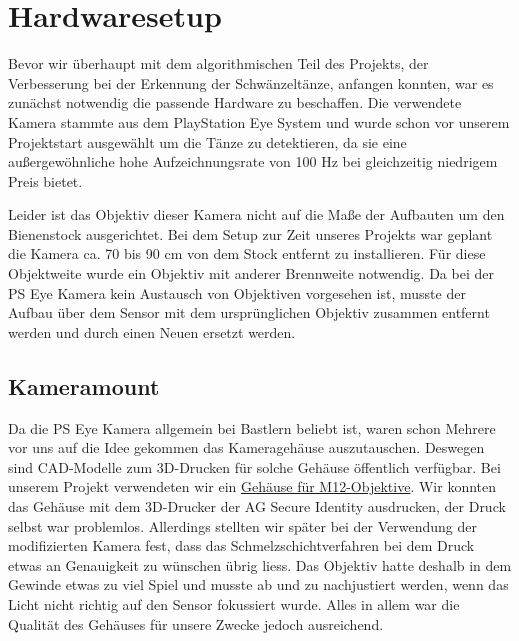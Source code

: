 \documentclass[11pt,a4paper]{article}
\title{\Veranstaltung}
\author{\Autoren}
\date{\today}
\begin{document}
\maketitle


%
%
%
%

\section{Hardwaresetup}%

Bevor wir überhaupt mit dem algorithmischen Teil des Projekts, der Verbesserung bei der Erkennung der Schwänzeltänze,
anfangen konnten, war es zunächst notwendig die passende Hardware zu beschaffen.
Die verwendete Kamera stammte aus dem PlayStation Eye System und wurde schon vor unserem Projektstart ausgewählt um 
die Tänze zu detektieren, da sie eine außergewöhnliche hohe Aufzeichnungsrate von 100 Hz bei gleichzeitig niedrigem Preis bietet.

Leider ist das Objektiv dieser Kamera nicht auf die Maße der Aufbauten um den Bienenstock ausgerichtet.
Bei dem Setup zur Zeit unseres Projekts war geplant die Kamera ca. 70 bis 90 cm von dem Stock entfernt zu installieren.
Für diese Objektweite wurde ein Objektiv mit anderer Brennweite notwendig.
Da bei der PS Eye Kamera kein Austausch von Objektiven vorgesehen ist, musste der Aufbau über dem Sensor mit dem ursprünglichen
Objektiv zusammen entfernt werden und durch einen Neuen ersetzt werden.

\subsection{Kameramount}%

Da die PS Eye Kamera allgemein bei Bastlern beliebt ist, waren schon Mehrere vor uns auf die Idee gekommen das Kameragehäuse auszutauschen.
Deswegen sind CAD-Modelle zum 3D-Drucken für solche Gehäuse öffentlich verfügbar.
Bei unserem Projekt verwendeten wir ein \href{http://www.thingiverse.com/thing:83754}{Gehäuse für M12-Objektive}.
Wir konnten das Gehäuse mit dem 3D-Drucker der AG Secure Identity ausdrucken, der Druck selbst war problemlos.
Allerdings stellten wir später bei der Verwendung der modifizierten Kamera fest, dass das Schmelzschichtverfahren bei dem Druck
etwas an Genauigkeit zu wünschen übrig liess.
Das Objektiv hatte deshalb in dem Gewinde etwas zu viel Spiel und musste ab und zu nachjustiert werden, wenn das Licht nicht richtig
auf den Sensor fokussiert wurde.
Alles in allem war die Qualität des Gehäuses für unsere Zwecke jedoch ausreichend.
\end{document}
